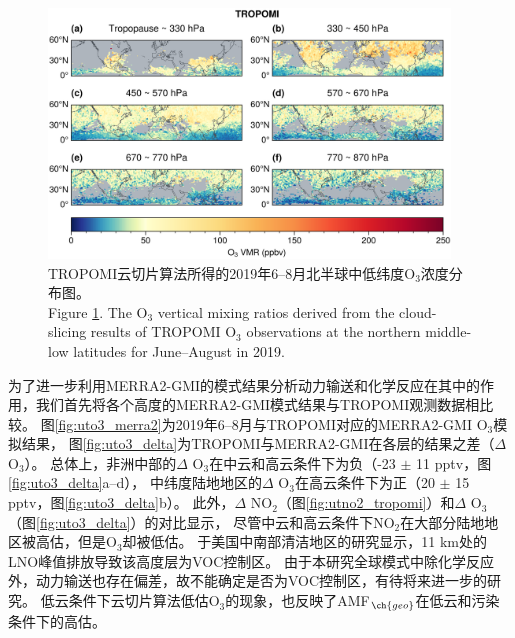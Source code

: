 \begin{figure}[H]
    \centering
    \includegraphics[width=0.95\textwidth]{./figures/uto3_tropomi.png}
    \caption{
    TROPOMI云切片算法所得的2019年6--8月北半球中低纬度O$_3$浓度分布图。 \\
    Figure \ref{fig:uto3_tropomi}. The O$_3$ vertical mixing ratios derived from the cloud-slicing results of TROPOMI O$_3$ observations at the northern middle-low latitudes for June--August in 2019.
    }
    \label{fig:uto3_tropomi}
\end{figure}

为了进一步利用MERRA2-GMI的模式结果分析动力输送和化学反应在其中的作用，我们首先将各个高度的MERRA2-GMI模式结果与TROPOMI观测数据相比较。
图\ref{fig:uto3_merra2}为2019年6--8月与TROPOMI对应的MERRA2-GMI O$_3$模拟结果，
图\ref{fig:uto3_delta}为TROPOMI与MERRA2-GMI在各层的结果之差（$\Delta$ O$_3$）。
总体上，非洲中部的$\Delta$ O$_3$在中云和高云条件下为负（-23 $\pm$ 11 pptv，图\ref{fig:uto3_delta}a--d），
中纬度陆地地区的$\Delta$ O$_3$在高云条件下为正（20 $\pm$ 15 pptv，图\ref{fig:uto3_delta}b）。
此外，$\Delta$ NO$_2$（图\ref{fig:utno2_tropomi}）和$\Delta$ O$_3$（图\ref{fig:uto3_delta}）的对比显示，
尽管中云和高云条件下NO$_2$在大部分陆地地区被高估，但是O$_3$却被低估。
\citet{Pickering.1990}于美国中南部清洁地区的研究显示，11 km处的LNO峰值排放导致该高度层为VOC控制区。
由于本研究全球模式中除化学反应外，动力输送也存在偏差，故不能确定是否为VOC控制区，有待将来进一步的研究。
低云条件下云切片算法低估O$_3$的现象，也反映了AMF$_{\ch{geo}}$在低云和污染条件下的高估\citep{BelmonteRivas.2015}。


